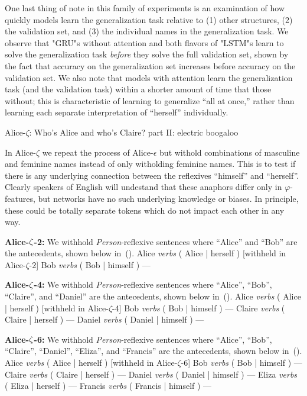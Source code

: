 One last thing of note in this family of experiments is an examination of 
how quickly models learn the generalization task relative to (1) other structures, (2) the validation set, and (3) the individual names in the
generalization task. We observe that "GRU"s without attention and both
flavors of "LSTM"s learn to solve the generalization task {\it before} they
solve the full validation set, shown by the fact that accuracy on the 
generalization set increases before accuracy on the validation set. We also 
note that models with attention learn the generalization task (and the validation task) within a shorter amount of time that those without; this is
characteristic of learning to generalize ``all at once,'' rather than learning
each separate interpretation of ``herself'' individually.


\ssec Alice-$\zeta$: Who's Alice and who's Claire? part II: electric boogaloo

In Alice-$\zeta$ we repeat the process of Alice-$\epsilon$ but withold 
combinations of masculine and feminine names instead of only witholding 
feminine names. This is to test if there is any underlying connection between
the reflexives ``himself'' and ``herself''. Clearly speakers of English will
undestand that these anaphors differ only in $\varphi$-features, but networks
have no such underlying knowledge or biases. In principle, these could be 
totally separate tokens which do not impact each other in any way.

\bigskip\noindent
{\bf Alice-$\boldmath \zeta$-2:} We withhold 
{\em Person}-reflexive sentences where ``Alice'' and ``Bob'' are the 
antecedents, shown below in~(\nextx).
\pex
	\a Alice {\em verbs} ( Alice | herself ) \hfill [withheld in Alice-$\zeta$-2]
	\a Bob {\em verbs} ( Bob | himself ) \hfill ---
\xe

\bigskip\noindent
{\bf Alice-$\boldmath \zeta$-4:} We withhold 
{\em Person}-reflexive sentences where ``Alice'', ``Bob'', ``Claire'', and ``Daniel'' are the 
antecedents, shown below in~(\nextx).
\pex
	\a Alice {\em verbs} ( Alice | herself ) \hfill [withheld in Alice-$\zeta$-4]
	\a Bob {\em verbs} ( Bob | himself ) \hfill ---
	\a Claire {\em verbs} ( Claire | herself ) \hfill ---
	\a Daniel {\em verbs} ( Daniel | himself ) \hfill ---
\xe

\bigskip\noindent
{\bf Alice-$\boldmath \zeta$-6:} We withhold 
{\em Person}-reflexive sentences where ``Alice'', ``Bob'', ``Claire'', ``Daniel'', ``Eliza'', and ``Francis'' are the antecedents, shown below in~(\nextx).
\pex
	\a Alice {\em verbs} ( Alice | herself ) \hfill [withheld in Alice-$\zeta$-6]
	\a Bob {\em verbs} ( Bob | himself ) \hfill ---
	\a Claire {\em verbs} ( Claire | herself ) \hfill ---
	\a Daniel {\em verbs} ( Daniel | himself ) \hfill ---
	\a Eliza {\em verbs} ( Eliza | herself ) \hfill ---
	\a Francis {\em verbs} ( Francis | himself ) \hfill ---
\xe

